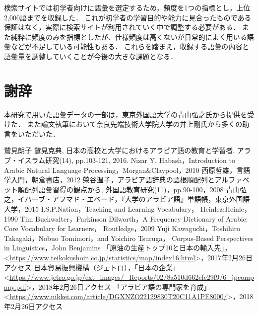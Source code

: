 \documentclass[technicalreport]{ieicej}
\begin{document}
検索サイトでは初学者向けに語彙を選定するため，頻度を1つの指標とし，上位2,000語までを収録した．
これが初学者の学習目的や能力に見合ったものである保証はなく，実際に検索サイトが利用されていく中で調整する必要がある．
また純粋に頻度のみを指標としたが、仕様頻度は高くないが日常的によく用いる語彙などが不足している可能性もある．
これらを踏まえ，収録する語彙の内容と語彙量を調整していくことが今後の大きな課題となる．

\section{謝辞}
本研究で用いた語彙データの一部は，東京外国語大学の青山弘之氏から提供を受けた．
また論文執筆において奈良先端技術大学院大学の井上剛氏から多くの助言をいただいた．

\begin{thebibliography}{99}
鷲見朗子 鷲見克典, 日本の高校と大学におけるアラビア語の教育と学習者, アラブ・イスラム研究(14), pp.103-121, 2016.
Nizar Y. Habash，Introduction to Arabic Natural Language Processing，Morgan\&Claypool，2010
西原哲雄，言語学入門，朝倉書店，2012
榮谷温子，アラビア語辞典の語根順配列とアルファベット順配列語彙習得の観点から, 外国語教育研究(11)，pp.90-100，2008
青山弘之，イハーブ・アフマド・エベード，『大学のアラビア語』単語帳，東京外国語大学，2015
I.S.P.Nation，Teaching and Learning Vocabulary， Heinle\&Heinle，1990
Tim Buckwalter，Parkinson Dilworth，A Frequency Dictionary of Arabic: Core Vocabulary for Learners， Routledge，2009
Yuji Kawaguchi，Toshihiro Takagaki，Nobuo Tomimori，and Yoichiro Tsuruga，
Corpus-Based Perspectives in Linguistics，John Benjamins
「原油の生産トップ10と日本の輸入先」， \textless \url{https://www.teikokushoin.co.jp/statistics/map/index16.html}\textgreater，2017年2月26日アクセス
 日本貿易振興機構（ジェトロ），「日本の企業」\textless \url{https://www.jetro.go.jp/ext_images/_Reports/02/8a510d662cfc29f9/6_jpcompany.pdf}\textgreater，2018年2月26日アクセス
「アラビア語の専門家を育成」\textless \url{https://www.nikkei.com/article/DGXNZO22129830T20C11A1PE8000/}\textgreater，2018年2月26日アクセス
\end{thebibliography}
\end{document}
